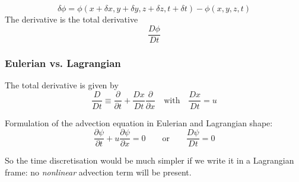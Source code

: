 \documentclass[aspectratio=43,9pt]{beamer}
\begin{document}
\begin{frame}
\hspace*{1cm}%
	\parbox[b]{.55\textwidth}{
		\begin{equation*}
			\delta \phi = \phi (x + \delta x, y + \delta y, z + \delta z, t + \delta t) -\phi (x,y,z,t)
		\end{equation*}
		The derivative is the total derivative
		\begin{equation*}
			 \frac{D \phi}{D t}
		\end{equation*}
	}
\end{frame}
%
%
\begin{frame}
	\frametitle{Eulerian vs. Lagrangian}
	\begin{myitemize}{2ex}
		\item The total derivative is given by
			\begin{equation*}
				\frac{D}{D t} \equiv \frac{\partial}{\partial t} + \frac{D x}{D t} \frac{\partial}{\partial x}
				\quad \text{with} \quad \frac{D x}{D t} = u
			\end{equation*}\vspace*{2mm}
		\item Formulation of the advection equation in Eulerian and Lagrangian shape:
			\begin{equation*}
				 \frac{\partial \psi}{\partial t} + u \frac{\partial \psi}{\partial x} = 0 \qquad\text{or}\qquad \frac{D \psi}{D t} =0
			\end{equation*}
		\item So the time discretisation would be much simpler if we write it in a Lagrangian frame: no \emph{nonlinear} advection term will be present.
	\end{myitemize}
\end{frame}
%
%
\end{document}
